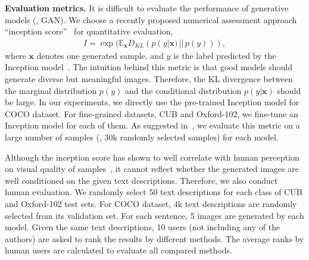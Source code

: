 \documentclass[10pt,twocolumn,letterpaper]{article}
\begin{document}
\textbf{Evaluation metrics. }
It is difficult to evaluate the performance of generative models (\eg, GAN). We choose a recently proposed numerical assessment approach ``inception score''~\cite{Salimans2016} for quantitative evaluation,
\begin{equation}\label{eq:Inception_score}
\begin{aligned}
I = \exp(\mathbb{E}_{\bm{x}} D_{KL} (p(y|\bm{x}) \,||\, p(y))),
\end{aligned}
\end{equation}
where $\bm{x}$ denotes one generated sample, and $y$ is the label predicted by the Inception model~\cite{Szegedy2016}. The intuition behind this metric is that good models should generate diverse but meaningful images. Therefore, the KL divergence between the marginal distribution $p(y)$ and the conditional distribution $p(y|\bm{x})$ should be large. In our experiments, we directly use the pre-trained Inception model for COCO dataset. For fine-grained datasets, CUB and Oxford-102, we fine-tune an Inception model for each of them. As suggested in~\cite{Salimans2016}, we evaluate this metric on a large number of samples (\ie, 30k randomly selected samples) for each model. 


Although the inception score has shown to well correlate with human perception on visual quality of samples~\cite{Salimans2016}, it cannot reflect whether the generated images are well conditioned on the given text descriptions. Therefore, we also conduct human evaluation. We randomly select 50 text descriptions for each class of CUB and Oxford-102 test sets. For COCO dataset, 4k text descriptions are randomly selected from its validation set. For each sentence, 5 images are generated by each model. Given the same text descriptions, 10 users (not including any of the authors) are asked to rank the results by different methods. The average ranks by human users are calculated to evaluate all compared methods.
\end{document}
